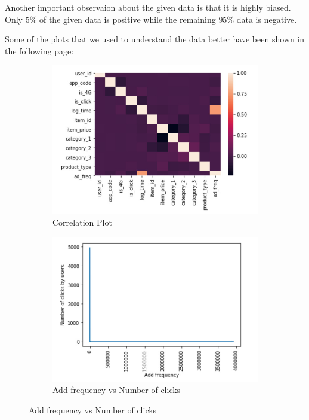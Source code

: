 \documentclass{scrreprt}
\begin{document}
Another important observaion about the given data is that it is highly biased. Only $5\%$ of the given data is positive while the remaining $95\%$ data is negative.

Some of the plots that we used to understand the data better have been shown in the following page:

\begin{figure}[!h]
\centering
\begin{subfigure}{.5\textwidth}
  \centering
  \includegraphics[scale=0.30]{1}
  \caption{Correlation Plot}
\end{subfigure}%
\begin{subfigure}{.5\textwidth}
  \centering
  \includegraphics[scale=0.30]{2}
  \caption{Add frequency vs Number of clicks}
\end{subfigure}%


\end{figure}
\end{document}
